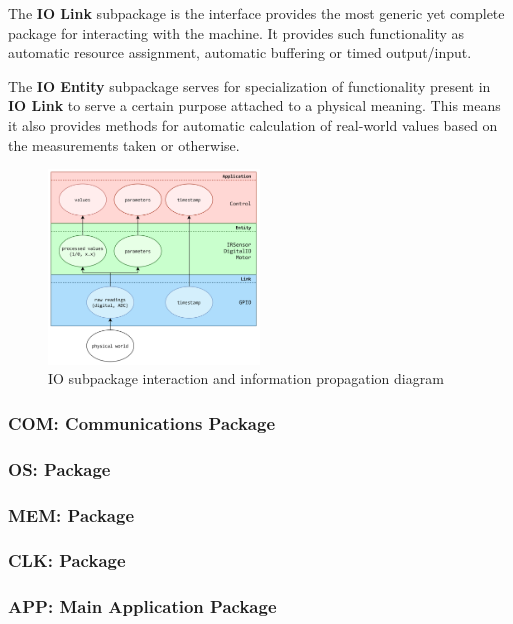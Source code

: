 The \textbf{IO Link} subpackage is the interface provides the most generic yet complete package for interacting with the machine. It provides such functionality as automatic resource assignment, automatic buffering or timed output/input.

The \textbf{IO Entity} subpackage serves for specialization of functionality present in \textbf{IO Link} to serve a certain purpose attached to a physical meaning. This means it also provides methods for automatic calculation of real-world values based on the measurements taken or otherwise.

\begin{figure}[H]
	\centering
	\includegraphics[width=0.5\textwidth]{./img/module-stack-io.png}
	\caption {IO subpackage interaction and information propagation diagram}
	\label{fig:navig-module-stack-io}
	\end{figure}



\subsubsection{COM: Communications Package}
\subsubsection{OS: Package}
\subsubsection{MEM: Package}
\subsubsection{CLK: Package}
\subsubsection{APP: Main Application Package}

